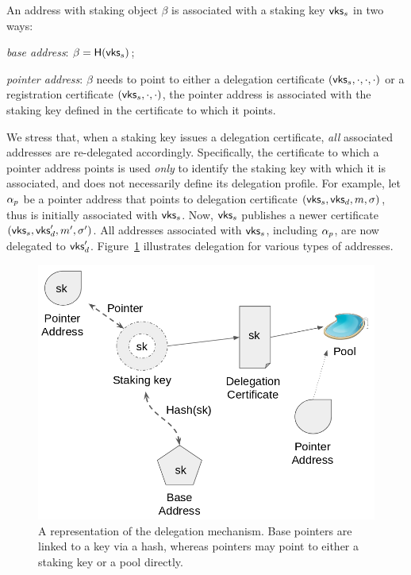 An address with staking object $\beta$ is associated with a staking key
$\mathsf{vks}_s$ in two ways:
\begin{inparaenum}[i)]
    \item \emph{base address}: $\beta = \mathsf{H}(\mathsf{vks}_s)$;
    \item \emph{pointer address}: $\beta$ needs to point to either a delegation
        certificate $(\mathsf{vks}_s, \cdot, \cdot, \cdot)$ or a
        registration certificate $(\mathsf{vks}_s, \cdot, \cdot)$, \ie the
        pointer address is associated with the staking key defined in the
        certificate to which it points.
\end{inparaenum}

We stress that, when a staking key issues a delegation certificate, \emph{all}
associated addresses are re-delegated accordingly. Specifically, the
certificate to which a pointer address points is used \emph{only} to identify
the staking key with which it is associated, and does not necessarily define
its delegation profile. For example, let $\alpha_p$ be a pointer address that
points to delegation certificate $(\mathsf{vks}_s, \mathsf{vks}_d, m,
\sigma)$, thus is initially associated with $\mathsf{vks}_s$. Now,
$\mathsf{vks}_s$ publishes a newer certificate $(\mathsf{vks}_s,
\mathsf{vks}_d', m', \sigma')$. All addresses associated with
$\mathsf{vks}_s$, including $\alpha_p$, are now delegated to
$\mathsf{vks}_d'$. Figure~\ref{fig:delegation} illustrates delegation for
various types of addresses.

\begin{figure}
    \begin{center}
      \includegraphics[width=0.6\columnwidth]{figures/delegation/delegation.png}
    \end{center}
    \caption{
        A representation of the delegation mechanism. Base pointers are linked
        to a key via a hash, whereas pointers may point to either a staking key
        or a pool directly.
    }
    \label{fig:delegation}
\end{figure}

